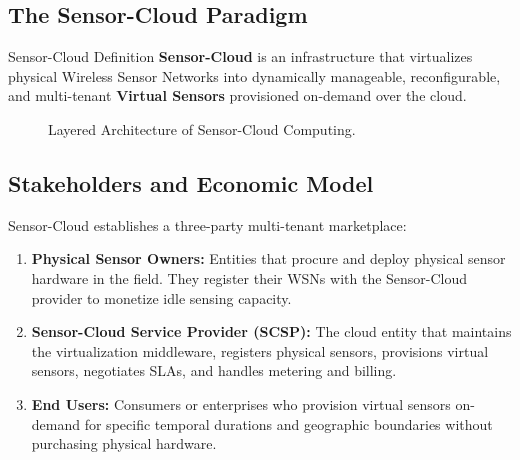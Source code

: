 \documentclass[11pt,a4paper,openany]{report}
\begin{document}
\subsection{The Sensor-Cloud Paradigm}
\begin{defbox}{Sensor-Cloud Definition}
\textbf{Sensor-Cloud} is an infrastructure that virtualizes physical Wireless Sensor Networks into dynamically manageable, reconfigurable, and multi-tenant \textbf{Virtual Sensors} provisioned on-demand over the cloud.
\end{defbox}

\begin{figure}[H]
\centering
{}
\caption{Layered Architecture of Sensor-Cloud Computing.}
\end{figure}

\subsection{Stakeholders and Economic Model}
Sensor-Cloud establishes a three-party multi-tenant marketplace:
\begin{enumerate}[leftmargin=*]
  \item \textbf{Physical Sensor Owners:} Entities that procure and deploy physical sensor hardware in the field. They register their WSNs with the Sensor-Cloud provider to monetize idle sensing capacity.
  \item \textbf{Sensor-Cloud Service Provider (SCSP):} The cloud entity that maintains the virtualization middleware, registers physical sensors, provisions virtual sensors, negotiates SLAs, and handles metering and billing.
  \item \textbf{End Users:} Consumers or enterprises who provision virtual sensors on-demand for specific temporal durations and geographic boundaries without purchasing physical hardware.
\end{enumerate}
\end{document}
